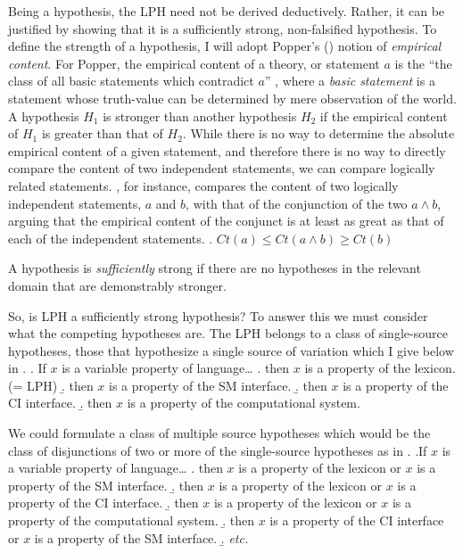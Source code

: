 \documentclass[MilwayThesis]{subfiles}
\begin{document}
Being a hypothesis, the LPH need not be derived deductively.
Rather, it can be justified by showing that it is a sufficiently strong, non-falsified hypothesis.
To define the strength of a hypothesis, I will adopt Popper's (\citeyear{popper1959logic,popper2014conjectures}) notion of \textit{empirical content}.
For Popper, the empirical content of a theory, or statement $a$ is the ``the class of all basic statements which contradict $a$'' \parencite[315]{popper2014conjectures}, where a \textit{basic statement} is a statement whose truth-value can be determined by mere observation of the world.
A hypothesis $H_1$ is stronger than another hypothesis $H_2$ if the empirical content of $H_1$ is greater than that of $H_2$.
While there is no way to determine the absolute empirical content of a given statement, and therefore there is no way to directly compare the content of two independent statements, we can compare logically related statements.
\textcite[295]{popper2014conjectures}, for instance, compares the content of two logically independent statements, $a$ and $b$, with that of the conjunction of the two $a\wedge b$, arguing that the empirical content of the conjunct is at least as great as that of each of the independent statements.
\ex. $Ct(a) \leq Ct(a\wedge b) \geq Ct(b)$

A hypothesis is \textit{sufficiently} strong if there are no hypotheses in the relevant domain that are demonstrably stronger.

So, is LPH a sufficiently strong hypothesis?
To answer this we must consider what the competing hypotheses are.
The LPH belongs to a class of single-source hypotheses, those that hypothesize a single source of variation which I give below in \Next.
\ex. If $x$ is a variable property of language\ldots
\a. then $x$ is a property of the lexicon. (= LPH)
\b. then $x$ is a property of the SM interface.
\b. then $x$ is a property of the CI interface.
\b. then $x$ is a property of the computational system.

We could formulate a class of multiple source hypotheses which would be the class of disjunctions of two or more of the single-source hypotheses as in \Next.
\ex.If $x$ is a variable property of language\ldots
\a. then $x$ is a property of the lexicon or $x$ is a property of the SM interface.
\b. then $x$ is a property of the lexicon or $x$ is a property of the CI interface. 
\b. then $x$ is a property of the lexicon or $x$ is a property of the computational system. 
\b. then $x$ is a property of the CI interface or $x$ is a property of the SM interface.
\b. \textit{etc.} 
\end{document}
